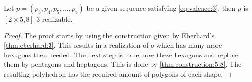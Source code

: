 \begin{corollary}
  Let $p = (p_3, p_4, p_5, \dots, p_n)$ be a given sequence satisfying \autoref{eq:valence:3}, then $p$ is $[2 \times 5, 8]$-$3$-realizable.
  \begin{proof}
    The proof starts by using the construction given by Eberhard's \autoref{thm:eberhard:3}. This results in a realization of $p$ which has many more hexagons then needed. The next step is to remove these hexagons and replace them by pentagons and heptagons. This is done by \autoref{thm:construction:5:8}. The resulting polyhedron has the required amount of polygons of each shape.
  \end{proof}
\end{corollary}
